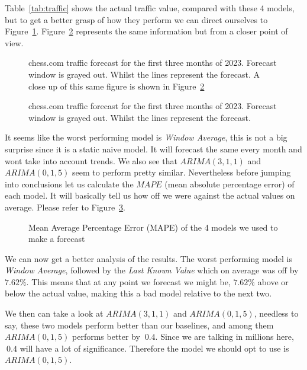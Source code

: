 \documentclass[journal]{IEEEtran}
\begin{document}
Table~\ref{tab:traffic} shows the actual traffic value, compared with these 4
models, but to get a better grasp of how they perform we can direct ourselves to
Figure~\ref{fig:forecast-large}. Figure~\ref{fig:forecast-zoom} represents the
same information but from a closer point of view.

\begin{figure}[htbp]
  \centering
  
    \caption{chess.com traffic forecast for the first three months of 2023.
    Forecast window is grayed out. Whilst the lines represent the forecast. A
    close up of this same figure is shown in Figure~\ref{fig:forecast-zoom}}
    \label{fig:forecast-large}
\end{figure}

\begin{figure}[htbp]
  \centering
  
    \caption{chess.com traffic forecast for the first three months of 2023.
    Forecast window is grayed out. Whilst the lines represent the forecast.}
    \label{fig:forecast-zoom}
\end{figure}

It seems like the worst performing model is \emph{Window Average}, this is not
a big surprise since it is a static naive model. It will forecast the same
every month and wont take into account trends. We also see that $ARIMA(3,1,1)$
and $ARIMA(0,1,5)$ seem to perform pretty similar. Nevertheless before jumping
into conclusions let us calculate the $MAPE$ (mean absolute percentage error)
of each model. It will basically tell us how off we were against the actual
values on average. Please refer to Figure~\ref{fig:mape}.

\begin{figure}[htbp]
  \centering
  
    \caption{Mean Average Percentage Error (MAPE) of the 4 models we used to
    make  a forecast}
    \label{fig:mape}
\end{figure}

We can now get a better analysis of the results. The worst performing model is
\emph{Window Average}, followed by the \emph{Last Known Value} which on
average was off by $7.62\%$. This means that at any point we forecast we might
be, $7.62\%$ above or below the actual value, making this a bad model relative
to the next two.

We then can take a look at $ARIMA(3,1,1)$ and $ARIMA(0,1,5)$, needless to say,
these two models perform better than our baselines, and among them
$ARIMA(0,1,5)$ performs better by $~0.4$. Since we are talking in millions
here, $~0.4$ will have a lot of significance. Therefore the model we should
opt to use is $ARIMA(0,1,5)$.
\end{document}
